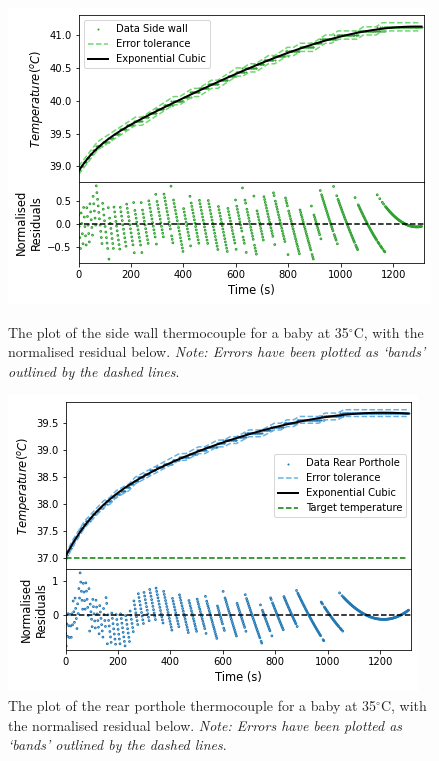 \documentclass{article}
\begin{document}
\begin{figure}[H]
\centering
\begin{minipage}{.48\linewidth}
    \captionsetup{justification=centering,margin=0.3cm}
    \includegraphics[width=\linewidth]{Side wall 35C.png}
    \caption{The plot of the side wall thermocouple for a baby at 35$^{\circ}$C, with the normalised residual below. \textit{Note: Errors have been plotted as ‘bands’ outlined by the dashed lines}.}
    \label{35C SW}
\end{minipage}
\hfill
\begin{minipage}{.48\linewidth}
    \captionsetup{justification=centering,margin=0.3cm}
    \includegraphics[width=0.99\linewidth]{Rear 35C.png}
    \caption{The plot of the rear porthole thermocouple for a baby at 35$^{\circ}$C, with the normalised residual below. \textit{Note: Errors have been plotted as ‘bands’ outlined by the dashed lines}.}
    \label{35C Rear}
    \end{minipage}
\end{figure}
\end{document}
